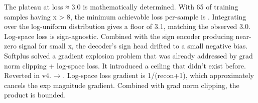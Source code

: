 {}
\markdownRendererSectionEnd \markdownRendererSectionBegin
{}\markdownRendererInterblockSeparator
{}The plateau at loss ≈ 3.0 is mathematically determined. With \markdownRendererTilde{}65\markdownRendererPercentSign{} of training samples having \markdownRendererPipe{}x\markdownRendererPipe{} > 8, the minimum achievable loss per-sample is . Integrating over the log-uniform distribution gives a floor of \markdownRendererTilde{}3.1, matching the observed \markdownRendererTilde{}3.0.\markdownRendererInterblockSeparator
{}
\markdownRendererSectionEnd \markdownRendererSectionBegin
{}\markdownRendererInterblockSeparator
{}Log-space loss  is sign-agnostic. Combined with the sign encoder producing near-zero signal for small \markdownRendererPipe{}x\markdownRendererPipe{}, the decoder's sign head drifted to a small negative bias.\markdownRendererInterblockSeparator
{}
\markdownRendererSectionEnd \markdownRendererSectionBegin
{}\markdownRendererInterblockSeparator
{}Softplus solved a gradient explosion problem that was already addressed by grad norm clipping + log-space loss. It introduced a ceiling that didn't exist before. Reverted in v4.\markdownRendererInterblockSeparator
{}\markdownRendererThematicBreak{}\markdownRendererInterblockSeparator
{}
\markdownRendererSectionEnd 
\markdownRendererSectionEnd \markdownRendererSectionBegin
{}\markdownRendererInterblockSeparator
{}\markdownRendererSectionBegin
{}\markdownRendererInterblockSeparator
{}  → .\markdownRendererParagraphSeparator
{} Log-space loss gradient is 1/(\markdownRendererPipe{}recon\markdownRendererPipe{}+1), which approximately cancels the exp magnitude gradient. Combined with grad norm clipping, the product is bounded.\markdownRendererInterblockSeparator
{}
\markdownRendererSectionEnd \markdownRendererSectionBegin
{}\markdownRendererInterblockSeparator
